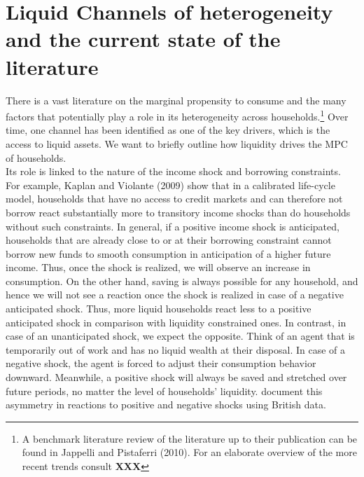 \section{Liquid Channels of heterogeneity and the current state of the literature} \label{sec:lit}
There is a vast literature on the marginal propensity to consume and the many factors that potentially play a role in its heterogeneity across households.\footnote{A benchmark literature review of the literature up to their publication can be found in Jappelli and Pistaferri (2010). For an elaborate overview of the more recent trends consult \textbf{XXX}} Over time, one channel has been identified as one of the key drivers, which is the access to liquid assets. We want to briefly outline how liquidity drives the MPC of households. \\ 
Its role is linked to the nature of the income shock and borrowing constraints. For example, Kaplan and Violante (2009) show that in a calibrated life-cycle model, households that have no access to credit markets and can therefore not borrow react substantially more to transitory income shocks than do households without such constraints. In general, if a positive income shock is anticipated, households that are already close to or at their borrowing constraint cannot borrow new funds to smooth consumption in anticipation of a higher future income. Thus, once the shock is realized, we will observe an increase in consumption. On the other hand, saving is always possible for any household, and hence we will not see a reaction once the shock is realized in case of a negative anticipated shock. Thus, more liquid households react less to a positive anticipated shock in comparison with liquidity constrained ones. In contrast, in case of an unanticipated shock, we expect the opposite. Think of an agent that is temporarily out of work and has no liquid wealth at their disposal. In case of a negative shock, the agent is forced to adjust their consumption behavior downward. Meanwhile, a positive shock will always be saved and stretched over future periods, no matter the level of households' liquidity. \cite{bunn_etal} document this asymmetry in reactions to positive and negative shocks using British data.\\
